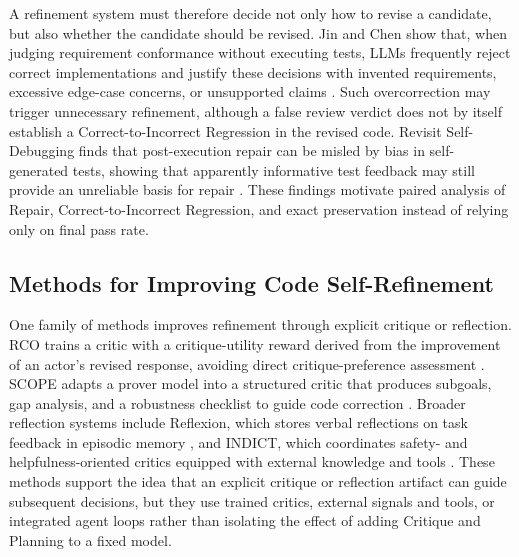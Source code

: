 A refinement system must therefore decide not only how to revise a candidate, but also whether the candidate should be revised.
Jin and Chen show that, when judging requirement conformance without executing tests, LLMs frequently reject correct implementations and justify these decisions with invented requirements, excessive edge-case concerns, or unsupported claims \cite{jin2026reliable}.
Such overcorrection may trigger unnecessary refinement, although a false review verdict does not by itself establish a Correct-to-Incorrect Regression in the revised code.
Revisit Self-Debugging finds that post-execution repair can be misled by bias in self-generated tests, showing that apparently informative test feedback may still provide an unreliable basis for repair \cite{chen-etal-2025-revisit}.
These findings motivate paired analysis of Repair, Correct-to-Incorrect Regression, and exact preservation instead of relying only on final pass rate.

\subsection{Methods for Improving Code Self-Refinement}

One family of methods improves refinement through explicit critique or reflection.
RCO trains a critic with a critique-utility reward derived from the improvement of an actor's revised response, avoiding direct critique-preference assessment \cite{yu-etal-2025-training}.
SCOPE adapts a prover model into a structured critic that produces subgoals, gap analysis, and a robustness checklist to guide code correction \cite{zhang2026scope}.
Broader reflection systems include Reflexion, which stores verbal reflections on task feedback in episodic memory \cite{shinn2023reflexion}, and INDICT, which coordinates safety- and helpfulness-oriented critics equipped with external knowledge and tools \cite{le2024indict}.
These methods support the idea that an explicit critique or reflection artifact can guide subsequent decisions, but they use trained critics, external signals and tools, or integrated agent loops rather than isolating the effect of adding Critique and Planning to a fixed model.

